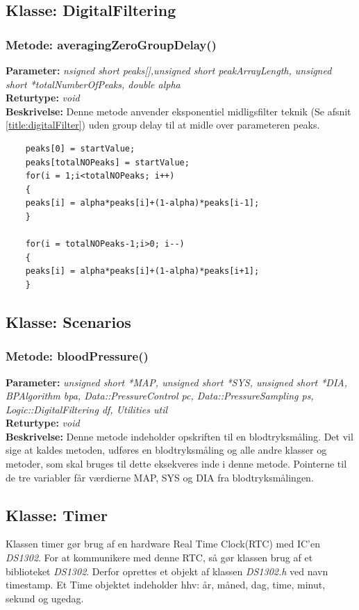 \subsection{Klasse: DigitalFiltering}

\subsubsection{Metode: averagingZeroGroupDelay()}
\textbf{Parameter: } \textit{nsigned short peaks[],unsigned short peakArrayLength, unsigned short *totalNumberOfPeaks, double alpha}
\\ \textbf{Returtype: } \textit{void}
\\ \textbf{Beskrivelse: } Denne metode anvender eksponentiel midligsfilter teknik (Se afsnit \ref{title:digitalFilter}) uden group delay til at midle over parameteren peaks.
\begin{lstlisting}
	peaks[0] = startValue;
	peaks[totalNOPeaks] = startValue;
	for(i = 1;i<totalNOPeaks; i++)
	{
	peaks[i] = alpha*peaks[i]+(1-alpha)*peaks[i-1];
	}
	
	for(i = totalNOPeaks-1;i>0; i--)
	{
	peaks[i] = alpha*peaks[i]+(1-alpha)*peaks[i+1];
	}
\end{lstlisting}

\subsection{Klasse: Scenarios}

\subsubsection{Metode: bloodPressure()}
\textbf{Parameter: } \textit{unsigned short *MAP, unsigned short *SYS, unsigned short *DIA, BPAlgorithm bpa, Data::PressureControl pc, Data::PressureSampling ps, Logic::DigitalFiltering df, Utilities util}
\\ \textbf{Returtype: } \textit{void}
\\ \textbf{Beskrivelse: } Denne metode indeholder opskriften til en blodtryksmåling. Det vil sige at kaldes metoden, udføres en blodtryksmåling og alle andre klasser og metoder, som skal bruges til dette eksekveres inde i denne metode. Pointerne til de tre variabler får værdierne MAP, SYS og DIA fra blodtryksmålingen.

\subsection{Klasse: Timer}
Klassen timer gør brug af en hardware Real Time Clock(RTC) med IC’en \textit{DS1302}. For at kommunikere med denne RTC, så gør klassen brug af et biblioteket \textit{DS1302}. Derfor oprettes et objekt af klassen \textit{DS1302.h} ved navn timestamp. Et Time objektet indeholder hhv: år, måned, dag, time, minut, sekund og ugedag. 

